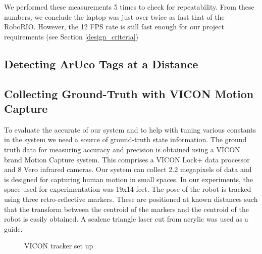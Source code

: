 \documentclass{article}
\begin{document}
    We performed these measurements 5 times to check for repeatability. From these numbers, we conclude the laptop was just over twice as fast that of the RoboRIO. However, the 12 FPS rate is still fast enough for our project requirements (see Section \ref{design_criteria})

  \subsection{Detecting ArUco Tags at a Distance}

  \subsection{Collecting Ground-Truth with VICON Motion Capture}

    To evaluate the accurate of our system and to help with tuning various constants in the system we need a source of ground-truth state information. The ground truth data for measuring accuracy and precision is obtained using a VICON brand Motion Capture system. This comprises a VICON Lock+ data processor and 8 Vero infrared cameras. Our system can collect 2.2 megapixels of data and is designed for capturing human motion in small spaces. In our experiments, the space used for experimentation was 19x14 feet. The pose of the robot is tracked using three retro-reflective markers. These are positioned at known distances such that the transform between the centroid of the markers and the centroid of the robot is easily obtained. A scalene triangle laser cut from acrylic was used as a guide.

    \begin{figure}[H]%
        \centering
        \qquad
        \caption{VICON tracker set up}%
        \label{fig:viconSetup}%
    \end{figure}
\end{document}
